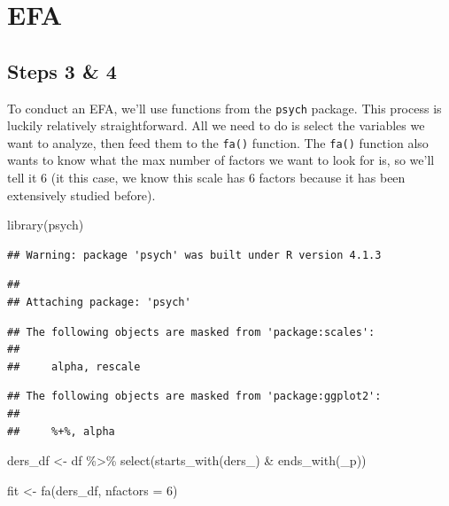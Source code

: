 \documentclass[
]{book}
\newenvironment{Shaded}{\begin{snugshade}}{\end{snugshade}}
\newcommand{\AttributeTok}[1]{\textcolor[rgb]{0.77,0.63,0.00}{#1}}
\newcommand{\DecValTok}[1]{\textcolor[rgb]{0.00,0.00,0.81}{#1}}
\newcommand{\FunctionTok}[1]{\textcolor[rgb]{0.00,0.00,0.00}{#1}}
\newcommand{\NormalTok}[1]{#1}
\newcommand{\OtherTok}[1]{\textcolor[rgb]{0.56,0.35,0.01}{#1}}
\newcommand{\SpecialCharTok}[1]{\textcolor[rgb]{0.00,0.00,0.00}{#1}}
\newcommand{\StringTok}[1]{\textcolor[rgb]{0.31,0.60,0.02}{#1}}
\begin{document}
\hypertarget{efa}{%
\section{EFA}\label{efa}}

\hypertarget{steps-3-4}{%
\subsection{Steps 3 \& 4}\label{steps-3-4}}

To conduct an EFA, we'll use functions from the \texttt{psych} package. This process is luckily relatively straightforward. All we need to do is select the variables we want to analyze, then feed them to the \texttt{fa()} function. The \texttt{fa()} function also wants to know what the max number of factors we want to look for is, so we'll tell it 6 (it this case, we know this scale has 6 factors because it has been extensively studied before).

\begin{Shaded}
\begin{Highlighting}[]
\FunctionTok{library}\NormalTok{(psych)}
\end{Highlighting}
\end{Shaded}

\begin{verbatim}
## Warning: package 'psych' was built under R version 4.1.3
\end{verbatim}

\begin{verbatim}
## 
## Attaching package: 'psych'
\end{verbatim}

\begin{verbatim}
## The following objects are masked from 'package:scales':
## 
##     alpha, rescale
\end{verbatim}

\begin{verbatim}
## The following objects are masked from 'package:ggplot2':
## 
##     %+%, alpha
\end{verbatim}

\begin{Shaded}
\begin{Highlighting}[]
\NormalTok{ders\_df }\OtherTok{\textless{}{-}}\NormalTok{ df }\SpecialCharTok{\%\textgreater{}\%} 
  \FunctionTok{select}\NormalTok{(}\FunctionTok{starts\_with}\NormalTok{(}\StringTok{\textquotesingle{}ders\_\textquotesingle{}}\NormalTok{) }\SpecialCharTok{\&} \FunctionTok{ends\_with}\NormalTok{(}\StringTok{\textquotesingle{}\_p\textquotesingle{}}\NormalTok{))}

\NormalTok{fit }\OtherTok{\textless{}{-}} \FunctionTok{fa}\NormalTok{(ders\_df, }\AttributeTok{nfactors =} \DecValTok{6}\NormalTok{)}
\end{Highlighting}
\end{Shaded}
\end{document}
